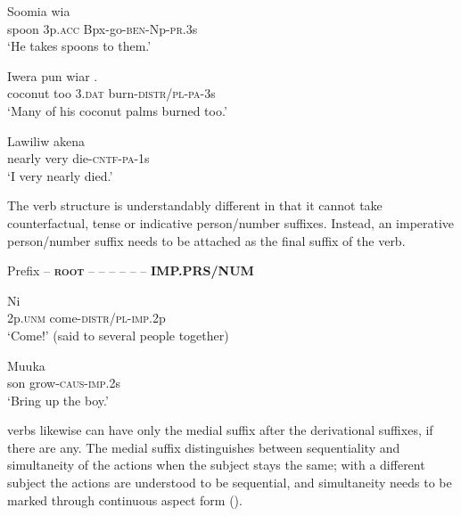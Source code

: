 \ea%
\label{ex:3:x180}
\gll Soomia wia  \\
spoon 3p.\textsc{acc} Bpx-go-\textsc{ben}-Np-\textsc{pr}.3s\\
\glt`He takes spoons to them.'
\z

\ea%
\label{ex:3:x181}
\gll Iwera pun wiar . \\
coconut too 3.\textsc{dat} burn-\textsc{distr}/\textsc{pl}-\textsc{pa}-3s\\
\glt`Many of his coconut palms burned too.'
\z

\ea%
\label{ex:3:x182}
\gll Lawiliw akena  \\
nearly very die-\textsc{cntf}-\textsc{pa}-1s \\
\glt`I very nearly died.'
\z

The  verb structure is understandably different in that it cannot take counterfactual, tense or indicative person/number suffixes. Instead, an imperative person/number suffix needs to be attached as the final suffix of the verb.

Prefix -- \textbf{\textsc{root}} --  --  --  --  --  -- \textbf{\textsc{IMP.PRS/NUM}}

\ea%
\label{ex:3:x183}
\gll Ni  \\
2p.\textsc{unm} come-\textsc{distr}/\textsc{pl}-\textsc{imp}.2p\\
\glt`Come!' (said to several people together) 
\z

\ea%
\label{ex:3:x184}
\gll Muuka  \\
son grow-\textsc{caus}-\textsc{imp}.2s \\
\glt`Bring up the boy.' 
\z

 verbs likewise can have only the medial suffix after the derivational suffixes, if there are any. The medial suffix distinguishes between sequentiality  and simultaneity  of the actions when the subject stays the same; with a different subject  the actions are understood to be sequential, and simultaneity needs to be marked through continuous aspect form ().
 
